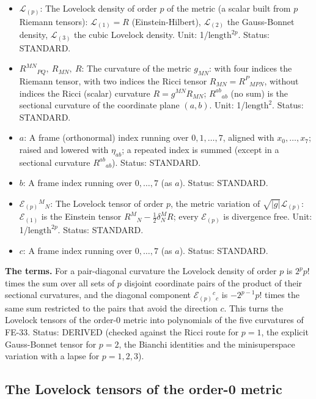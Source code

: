 \documentclass[
  10pt,
]{article}
\providecommand{\tightlist}{%
  \setlength{\itemsep}{0pt}\setlength{\parskip}{0pt}}
\begin{document}
\begin{itemize}
\tightlist
\item
  \(\mathcal{L}_{(p)}\): The Lovelock density of order \(p\) of the
  metric (a scalar built from \(p\) Riemann tensors):
  \(\mathcal{L}_{(1)} = R\) (Einstein-Hilbert), \(\mathcal{L}_{(2)}\)
  the Gauss-Bonnet density, \(\mathcal{L}_{(3)}\) the cubic Lovelock
  density. Unit: 1/\(\mathrm{length}^{2p}\). Status: STANDARD.
\item
  \(R^{MN}{}_{PQ},\ R_{MN},\ R\): The curvature of the metric
  \(g_{MN}\): with four indices the Riemann tensor, with two indices the
  Ricci tensor \(R_{MN} = R^P{}_{MPN}\), without indices the Ricci
  (scalar) curvature \(R = g^{MN}R_{MN}\); \(R^{ab}{}_{ab}\) (no sum) is
  the sectional curvature of the coordinate plane \((a, b)\). Unit:
  1/\(\mathrm{length}^{2}\). Status: STANDARD.
\item
  \(a\): A frame (orthonormal) index running over \(0, 1, \dots, 7\),
  aligned with \(x_0, \dots, x_7\); raised and lowered with
  \(\eta_{ab}\); a repeated index is summed (except in a sectional
  curvature \(R^{ab}{}_{ab}\)). Status: STANDARD.
\item
  \(b\): A frame index running over \(0, \dots, 7\) (as \(a\)). Status:
  STANDARD.
\item
  \(\mathcal{E}_{(p)}{}^M{}_N\): The Lovelock tensor of order \(p\), the
  metric variation of \(\sqrt{\lvert g\rvert}\mathcal{L}_{(p)}\):
  \(\mathcal{E}_{(1)}\) is the Einstein tensor
  \(R^M{}_N - \frac12\delta^M_NR\); every \(\mathcal{E}_{(p)}\) is
  divergence free. Unit: 1/\(\mathrm{length}^{2p}\). Status: STANDARD.
\item
  \(c\): A frame index running over \(0, \dots, 7\) (as \(a\)). Status:
  STANDARD.
\end{itemize}

\textbf{The terms.} For a pair-diagonal curvature the Lovelock density
of order \(p\) is \(2^pp!\) times the sum over all sets of \(p\)
disjoint coordinate pairs of the product of their sectional curvatures,
and the diagonal component \(\mathcal{E}_{(p)}{}^c{}_c\) is
\(-2^{p-1}p!\) times the same sum restricted to the pairs that avoid the
direction \(c\). This turns the Lovelock tensors of the order-0 metric
into polynomials of the five curvatures of FE-33. Status: DERIVED
(checked against the Ricci route for \(p = 1\), the explicit
Gauss-Bonnet tensor for \(p = 2\), the Bianchi identities and the
minisuperspace variation with a lapse for \(p = 1, 2, 3\)).

\hypertarget{the-lovelock-tensors-of-the-order-0-metric}{%
\subsection{The Lovelock tensors of the order-0
metric}\label{the-lovelock-tensors-of-the-order-0-metric}}
\end{document}
